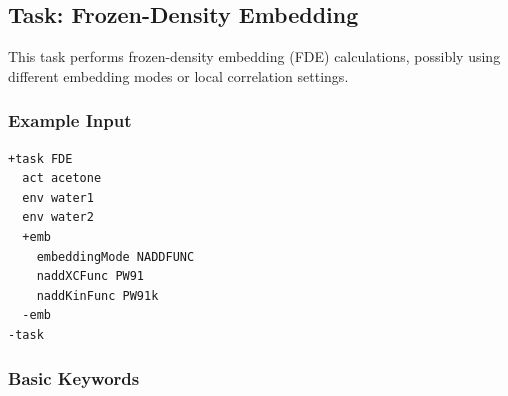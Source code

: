 \documentclass[bibliography=totocnumbered,a4paper,10pt,oneside]{scrbook}
\begin{document}
\subsection{Task: Frozen-Density Embedding}
\label{sec:FDE}
This task performs frozen-density embedding (FDE) calculations, possibly using different embedding modes or local correlation settings.
\subsubsection{Example Input}
\begin{lstlisting}
+task FDE
  act acetone
  env water1
  env water2
  +emb
    embeddingMode NADDFUNC
    naddXCFunc PW91
    naddKinFunc PW91k
  -emb
-task
\end{lstlisting}
\subsubsection{Basic Keywords}
\end{document}
